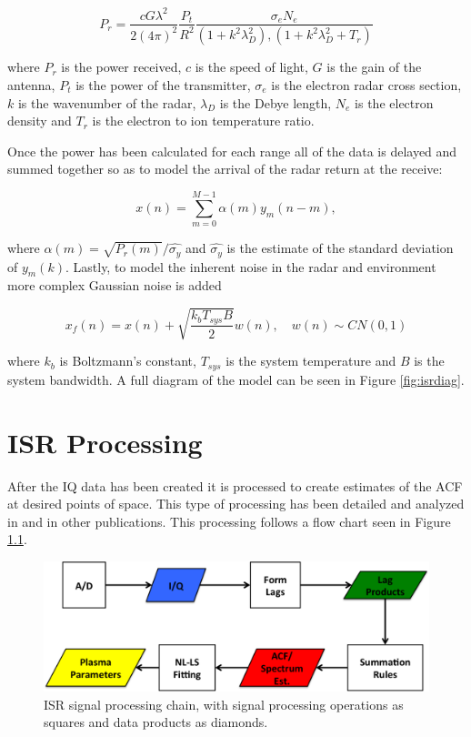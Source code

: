 \documentclass[10pt]{report}
\begin{document}
\begin{equation}
\label{eq3}
P_r = \frac{cG \lambda^2}{2(4\pi)^2}\frac{P_t }{R^2}\frac{\sigma_e N_e}{(1+k^2\lambda_D^2),(1+k^2\lambda_D^2 + T_r)}
\end{equation}
 
 \noindent where $P_r$ is the power received, $c$ is the speed of light, $G$ is the gain of the antenna, $P_t$ is the power of the transmitter, $\sigma_e$ is the electron radar cross section, $k$ is the wavenumber of the radar, $\lambda_D$ is the Debye length, $N_e$ is the electron density and $T_r$ is the electron to ion temperature ratio.
  
Once the power has been calculated for each range all of the data is delayed and summed together so as to model the arrival of the radar return at the receive: 
 
\begin{equation}
\label{eq4}
x(n) = \displaystyle\sum\limits_{m =0}^{M-1} \alpha(m)y_m(n-m),
\end{equation}

\noindent where $\alpha(m) = \sqrt{P_r(m)}/\hat{\sigma_y}$ and $\hat{\sigma_y}$ is the estimate of the standard deviation of $y_m(k)$. Lastly, to model the inherent noise in the radar and environment more complex Gaussian noise is added

\begin{equation}
\label{eq4}
x_f(n) = x(n) +\sqrt{\frac{k_bT_{sys}B}{2}} w(n), \quad w(n)\sim CN(0,1)
\end{equation}

\noindent where $k_b$ is Boltzmann's constant, $T_{sys}$ is the system temperature and $B$ is the system bandwidth.
A full diagram of the model can be seen in Figure \ref{fig:isrdiag}.

\chapter{ISR Processing}

After the IQ data has been created it is processed to create estimates of the ACF at desired points of space. This type of processing has been detailed and analyzed in \cite{farley1969} and in other publications. This processing follows a flow chart seen in Figure \ref{fig:chain}.

\begin{figure}[!t]
\centering
\includegraphics[width=6in]{datastackchain}
\caption{ISR signal processing chain, with signal processing operations as squares and data products as diamonds.}
\label{fig:chain}
\end{figure}
\end{document}
